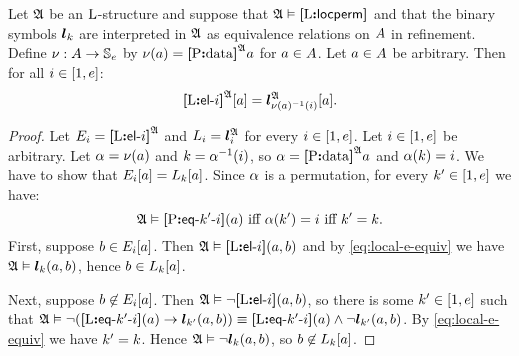 \begin{remark}\label{rem:local-e-m}
Let $\mathfrak{A}$ be an $\mathrm{L}$-structure and suppose that $\mathfrak{A} \vDash {\bm{[}\mathrm{L}\mathord{\bm{:}}\mathsf{locperm}\bm{]}}$
and that the binary symbols $\bm{l}_{k}$ are interpreted in $\mathfrak{A}$ as equivalence
relations on $A$ in refinement.
Define $\nu : A \to \mathbb{S}_{e}$ by $\nu(a) = {\bm{[}\mathrm{P}\mathord{\bm{:}}\mathrm{data}\bm{]}}^{\mathfrak{A}}a$
for $a \in A$.
Let $a \in A$ be arbitrary.
Then for all $i \in [1,e]$:
\[
  {\bm{[}\mathrm{L}\mathord{\bm{:}}\mathsf{el}{\hbox{-}}i\bm{]}}^{\mathfrak{A}}[a] = \bm{l}_{\nu(a)^{-1}(i)}^{\mathfrak{A}}[a].
\]
\end{remark}
\begin{proof}
Let $E_{i} = {\bm{[}\mathrm{L}\mathord{\bm{:}}\mathsf{el}{\hbox{-}}i\bm{]}}^{\mathfrak{A}}$ and $L_{i} = \bm{l}_{i}^{\mathfrak{A}}$
for every $i \in [1,e]$.
Let $i \in [1,e]$ be arbitrary. 
Let $\alpha = \nu(a)$ and $k = \alpha^{-1}(i)$,
so $\alpha = {\bm{[}\mathrm{P}\mathord{\bm{:}}\mathrm{data}\bm{]}}^{\mathfrak{A}}a$ and $\alpha(k) = i$.
We have to show that $E_{i}[a] = L_{k}[a]$.
Since $\alpha$ is a permutation, for every ${k'} \in [1,e]$ we have:
\begin{equation}\label{eq:local-e-equiv}
  \mifff{
  \StrA \vDash \feqAA\PS\kkp\ii(\ea)}{
  \perma(\kkp) = \ii}{ 
  \kkp = \kk}.
\end{equation}
First, suppose $b \in E_{i}[a]$.
Then $\mathfrak{A} \vDash {\bm{[}\mathrm{L}\mathord{\bm{:}}\mathsf{el}{\hbox{-}}i\bm{]}}(a,b)$ and by \cref{eq:local-e-equiv} we have
$\mathfrak{A} \vDash \bm{l}_{k}(a,b)$, hence $b \in L_{k}[a]$.

Next, suppose $b \not\in E_{i}[a]$.
Then $\mathfrak{A} \vDash \lnot{\bm{[}\mathrm{L}\mathord{\bm{:}}\mathsf{el}{\hbox{-}}i\bm{]}}(a,b)$, so there is some
${k'} \in [1,e]$ such that 
$\mathfrak{A} \vDash \lnot({\bm{[}\mathrm{L}\mathord{\bm{:}}\mathsf{eq}{\hbox{-}}{k'}{\hbox{-}}i\bm{]}}(a) \rightarrow \bm{l}_{{k'}}(a,b)) 
\equiv {\bm{[}\mathrm{L}\mathord{\bm{:}}\mathsf{eq}{\hbox{-}}{k'}{\hbox{-}}i\bm{]}}(a) \land \lnot\bm{l}_{{k'}}(a,b)$.
By \cref{eq:local-e-equiv} we have ${k'} = k$.
Hence $\mathfrak{A} \vDash \lnot \bm{l}_{k}(a,b)$, so $b \not\in L_{k}[a]$.
\end{proof}

